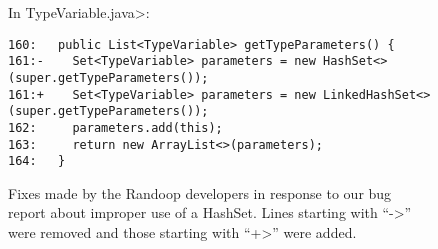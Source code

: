 \begin{figure*}

\noindent
In \<TypeVariable.java>:

\begin{Verbatim}
160:   public List<TypeVariable> getTypeParameters() {
161:-    Set<TypeVariable> parameters = new HashSet<>(super.getTypeParameters());
161:+    Set<TypeVariable> parameters = new LinkedHashSet<>(super.getTypeParameters());
162:     parameters.add(this);
163:     return new ArrayList<>(parameters);
164:   }
\end{Verbatim}

\caption{Fixes made by the Randoop developers in response to our bug report
  about improper use of a HashSet.  Lines starting with ``\<->'' were
 removed and those starting with ``\<+>'' were added.}
\label{fig:randoop-bug-hashset}
\end{figure*}



